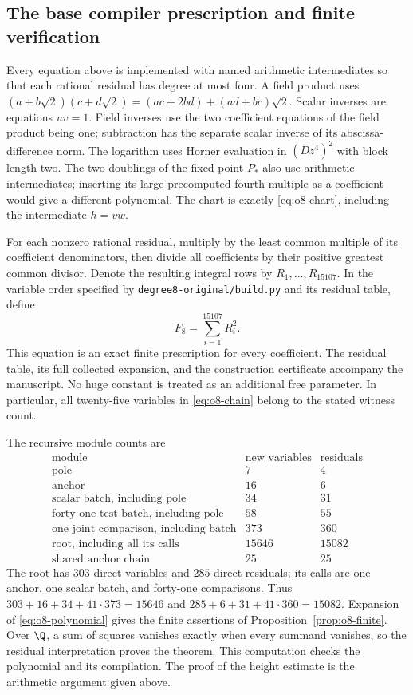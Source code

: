 \subsection{The base compiler prescription and finite verification}

Every equation above is implemented with named arithmetic intermediates
so that each rational residual has degree at most four. A field product
uses $(a+b\sqrt2)(c+d\sqrt2)=(ac+2bd)+(ad+bc)\sqrt2$.
Scalar inverses are equations $uv=1$. Field inverses use the two
coefficient equations of the field product being one; subtraction has
the separate scalar inverse of its abscissa-difference norm.
The logarithm uses Horner evaluation in $(Dz^4)^2$ with block length
two. The two doublings of the fixed point $P_*$ also use arithmetic
intermediates; inserting its large precomputed fourth multiple as a
coefficient would give a different polynomial. The chart is exactly
\eqref{eq:o8-chart}, including the intermediate $h=vw$.

For each nonzero rational residual, multiply by the least common multiple
of its coefficient denominators, then divide all coefficients by their
positive greatest common divisor. Denote the resulting integral rows
by $R_1,\ldots,R_{15107}$. In the variable order specified by
\texttt{degree8-original/build.py} and its residual table, define
\begin{equation}\label{eq:o8-polynomial}
 F_8=\sum_{i=1}^{15107}R_i^2.
\end{equation}
This equation is an exact finite prescription for every coefficient.
The residual table, its full collected expansion, and the construction
certificate accompany the manuscript. No huge constant is treated as
an additional free parameter. In particular, all twenty-five variables
in \eqref{eq:o8-chain} belong to the stated witness count.

The recursive module counts are
\[
\begin{array}{c|rr}
 \text{module}&\text{new variables}&\text{residuals}\\\hline
 \text{pole}&7&4\\
 \text{anchor}&16&6\\
 \text{scalar batch, including pole}&34&31\\
 \text{forty-one-test batch, including pole}&58&55\\
 \text{one joint comparison, including batch}&373&360\\
 \text{root, including all its calls}&15646&15082\\
 \text{shared anchor chain}&25&25
\end{array}
\]
The root has $303$ direct variables and $285$ direct residuals; its
calls are one anchor, one scalar batch, and forty-one comparisons.
Thus $303+16+34+41\cdot373=15646$ and
$285+6+31+41\cdot360=15082$. Expansion of \eqref{eq:o8-polynomial}
gives the finite assertions of Proposition~\ref{prop:o8-finite}.
Over $\Q$, a sum of squares vanishes exactly when every summand
vanishes, so the residual interpretation proves the theorem.
This computation checks the polynomial and its compilation. The proof
of the height estimate is the arithmetic argument given above.

